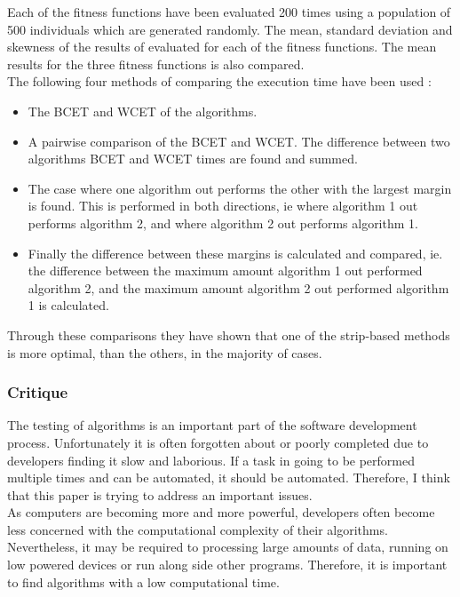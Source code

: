 \documentclass[10pt,a4paper,openbib]{article}
\begin{document}
\begin{multicols}{2}
\noindent Each of the fitness functions have been evaluated 200 times using a population of 500 individuals which are generated randomly. The mean, standard deviation and skewness of the results of evaluated for each of the fitness functions. The mean results for the three fitness functions is also compared. \\

\noindent The following four methods of comparing the execution time have been used : 
\begin{itemize}
\item The BCET and WCET of the algorithms. 
\item A pairwise comparison of the BCET and WCET. The difference between two algorithms BCET and WCET times are found and summed. 
\item The case where one algorithm out performs the other with the largest margin is found. This is performed in both directions, ie where algorithm 1 out performs algorithm 2, and where algorithm 2 out performs algorithm 1.
\item Finally the difference between these margins is calculated and compared, ie. the difference between the maximum amount algorithm 1 out performed algorithm 2, and the maximum amount algorithm 2 out performed algorithm 1 is calculated.
\end{itemize}
Through these comparisons they have shown that one of the strip-based methods is more optimal, than the others, in the majority of cases.

\subsubsection{Critique}
The testing of algorithms is an important part of the software development process. Unfortunately it is often forgotten about or poorly completed due to developers finding it slow and laborious. If a task in going to be performed multiple times and can be automated, it should be automated. Therefore, I think that this paper is trying to address an important issues. \\

\noindent As computers are becoming more and more powerful, developers often become less concerned with the computational complexity of their algorithms. Nevertheless, it may be required to processing large amounts of data, running on low powered devices or run along side other programs. Therefore, it is important to find algorithms with a low computational time. \\


\end{multicols}
\end{document}
